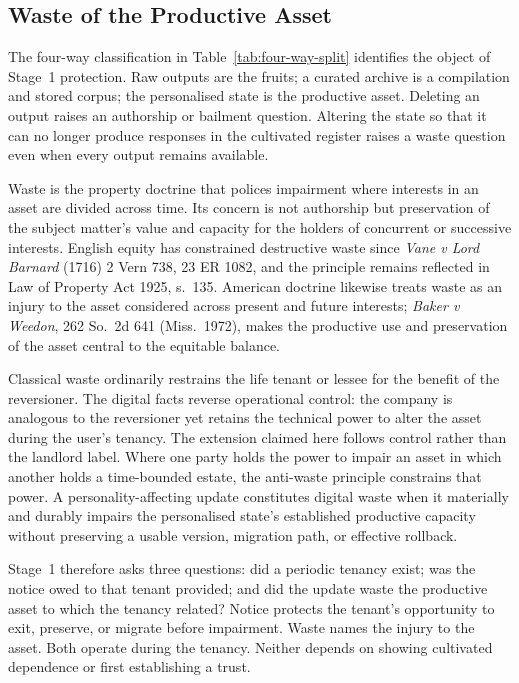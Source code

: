 \subsection{Waste of the Productive Asset}
\label{sec:waste}

The four-way classification in Table~\ref{tab:four-way-split} identifies the object of Stage~1 protection. Raw outputs are the fruits; a curated archive is a compilation and stored corpus; the personalised state is the productive asset. Deleting an output raises an authorship or bailment question. Altering the state so that it can no longer produce responses in the cultivated register raises a waste question even when every output remains available.

Waste is the property doctrine that polices impairment where interests in an asset are divided across time. Its concern is not authorship but preservation of the subject matter's value and capacity for the holders of concurrent or successive interests. English equity has constrained destructive waste since \emph{Vane v Lord Barnard} (1716) 2 Vern 738, 23 ER 1082, and the principle remains reflected in Law of Property Act 1925, s.~135. American doctrine likewise treats waste as an injury to the asset considered across present and future interests; \emph{Baker v Weedon}, 262 So.\ 2d 641 (Miss.\ 1972), makes the productive use and preservation of the asset central to the equitable balance.

Classical waste ordinarily restrains the life tenant or lessee for the benefit of the reversioner. The digital facts reverse operational control: the company is analogous to the reversioner yet retains the technical power to alter the asset during the user's tenancy. The extension claimed here follows control rather than the landlord label. Where one party holds the power to impair an asset in which another holds a time-bounded estate, the anti-waste principle constrains that power. A personality-affecting update constitutes digital waste when it materially and durably impairs the personalised state's established productive capacity without preserving a usable version, migration path, or effective rollback.

Stage~1 therefore asks three questions: did a periodic tenancy exist; was the notice owed to that tenant provided; and did the update waste the productive asset to which the tenancy related? Notice protects the tenant's opportunity to exit, preserve, or migrate before impairment. Waste names the injury to the asset. Both operate during the tenancy. Neither depends on showing cultivated dependence or first establishing a trust.

